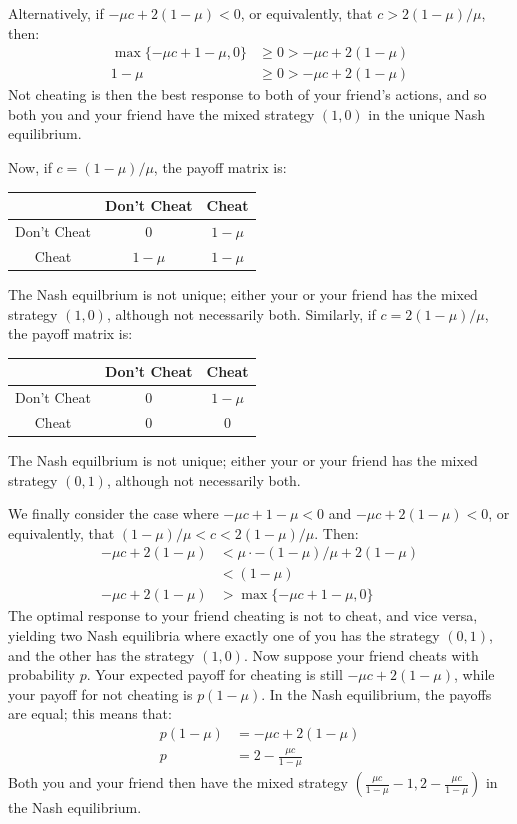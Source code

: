 \documentclass{article}
\begin{document}
Alternatively, if $-\mu c + 2(1 - \mu) < 0$, or equivalently, that $c > 2(1 - \mu)/\mu$, then:
\begin{align*}
    \max\{-\mu c + 1 - \mu, 0\} & \geq 0 > -\mu c + 2(1 - \mu) \\
    1 - \mu & \geq 0 > -\mu c + 2(1 - \mu)
\end{align*}
Not cheating is then the best response to both of your friend's actions, and so both you and your friend have the mixed strategy $(1, 0)$ in the unique Nash equilibrium.

Now, if $c = (1 - \mu)/\mu$, the payoff matrix is:
\begin{center}
\begin{tabular}{|c|c|c|}
    \hline
     & Don't Cheat & Cheat \\
     \hline
     Don't Cheat & $0$ & $1 - \mu$ \\
     \hline
     Cheat & $1 - \mu$ & $1 - \mu$ \\
     \hline
\end{tabular}
\end{center}
The Nash equilbrium is not unique; either your or your friend has the mixed strategy $(1, 0)$, although not necessarily both. Similarly, if $c = 2(1 - \mu)/\mu$, the payoff matrix is:
\begin{center}
\begin{tabular}{|c|c|c|}
    \hline
     & Don't Cheat & Cheat \\
     \hline
     Don't Cheat & $0$ & $1 - \mu$ \\
     \hline
     Cheat & $0$ & $0$ \\
     \hline
\end{tabular}
\end{center}
The Nash equilbrium is not unique; either your or your friend has the mixed strategy $(0, 1)$, although not necessarily both.

We finally consider the case where $-\mu c + 1 - \mu < 0$ and $-\mu c + 2(1 - \mu) < 0$, or equivalently, that $(1 - \mu)/\mu < c < 2(1 - \mu)/\mu$. Then:
\begin{align*}
    -\mu c + 2(1 - \mu) & < \mu \cdot -(1 - \mu)/\mu + 2(1 - \mu) \\
    & < (1 - \mu) \\
     -\mu c + 2(1 - \mu) & > \max\{-\mu c + 1 - \mu, 0\}
\end{align*}
The optimal response to your friend cheating is not to cheat, and vice versa, yielding two Nash equilibria where exactly one of you has the strategy $(0, 1)$, and the other has the strategy $(1, 0)$. Now suppose your friend cheats with probability $p$. Your expected payoff for cheating is still $-\mu c + 2(1 - \mu)$, while your payoff for not cheating is $p(1 - \mu)$. In the Nash equilibrium, the payoffs are equal; this means that:
\begin{align*}
    p(1 - \mu) & = -\mu c + 2(1 - \mu) \\
    p & = 2 - \frac{\mu c}{1 - \mu}
\end{align*}
Both you and your friend then have the mixed strategy $(\frac{\mu c}{1 - \mu} - 1, 2 - \frac{\mu c}{1 - \mu})$ in the Nash equilibrium.
\end{document}
